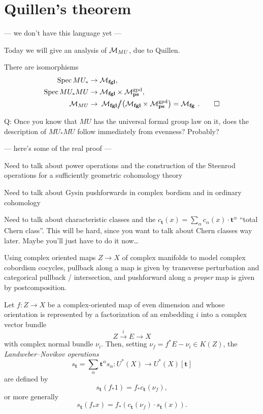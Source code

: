 \section{Quillen's theorem}

--- we don't have this language yet ---

Today we will give an analysis of $\mathcal{M}_{MU}$, due to Quillen.

\begin{theorem}[Quillen]
There are isomorphisms
\begin{align*}
\operatorname{Spec} MU_* & \to \mathcal{M}_{\mathbf{fgl}}, \\
\operatorname{Spec} MU_* MU & \to \mathcal{M}_{\mathbf{fgl}} \times \mathcal{M}_{\mathbf{ps}}^{\mathrm{gpd}}, \\
\mathcal{M}_{MU} & \to \left. \left. \mathcal{M}_{\mathbf{fgl}} \middle/\!\!\!\middle/ \left( \mathcal{M}_{\mathbf{fgl}} \times \mathcal{M}_{\mathbf{ps}}^{\mathrm{gpd}} \right) = \mathcal{M}_{\mathbf{fg}} \right. \right. . \qed
\end{align*}
\end{theorem}

Q: Once you know that $MU$ has the universal formal group law on it, does the description of $MU_* MU$ follow immediately from evenness?  Probably?

--- here's some of the real proof ---



Need to talk about power operations and the construction of the Steenrod operations for a sufficiently geometric cohomology theory

Need to talk about Gysin pushforwards in complex bordism and in ordinary cohomology

Need to talk about characteristic classes and the $c_{\mathbf t}(x) = \sum_\alpha c_\alpha(x) \cdot \mathbf t^\alpha$ ``total Chern class''.  This will be hard, since you want to talk about Chern classes way later.  Maybe you'll just have to do it now\ldots

\begin{definition}
Using complex oriented maps $Z \to X$ of complex manifolds to model complex cobordism cocycles, pullback along a map is given by transverse perturbation and categorical pullback / intersection, and pushforward along a \emph{proper} map is given by postcomposition.
\end{definition}

\begin{definition}
Let $f: Z \to X$ be a complex-oriented map of even dimension and whose orientation is represented by a factorization of an embedding $i$ into a complex vector bundle \[Z \xrightarrow i E \to X\] with complex normal bundle $\nu_i$.  Then, setting $\nu_f = f^* E - \nu_i \in K(Z)$, the \textit{Landweber--Novikov operations} \[s_{\mathbf t} = \sum_\alpha \mathbf t^\alpha s_\alpha: U^*(X) \to U^*(X)[\mathbf t]\] are defined by \[s_{\mathbf t}(f_* 1) = f_* c_{\mathbf t}(\nu_f),\] or more generally \[s_{\mathbf t}(f_* x) = f_*(c_{\mathbf t}(\nu_f) \cdot s_{\mathbf t}(x)).\]
\end{definition}

